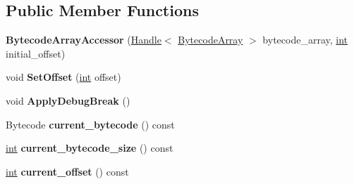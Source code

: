 \subsection*{Public Member Functions}
\begin{DoxyCompactItemize}
\item 
\mbox{\label{classv8_1_1internal_1_1interpreter_1_1BytecodeArrayAccessor_a31476fae6c83ffaafa39e88d589a50cb}} 
{\bfseries Bytecode\+Array\+Accessor} (\mbox{\hyperlink{classv8_1_1internal_1_1Handle}{Handle}}$<$ \mbox{\hyperlink{classv8_1_1internal_1_1BytecodeArray}{Bytecode\+Array}} $>$ bytecode\+\_\+array, \mbox{\hyperlink{classint}{int}} initial\+\_\+offset)
\item 
\mbox{\label{classv8_1_1internal_1_1interpreter_1_1BytecodeArrayAccessor_a3eddb0189545e35104117380f4828c97}} 
void {\bfseries Set\+Offset} (\mbox{\hyperlink{classint}{int}} offset)
\item 
\mbox{\label{classv8_1_1internal_1_1interpreter_1_1BytecodeArrayAccessor_aa9a9072e3ac5266e62da2f6d805c6a9f}} 
void {\bfseries Apply\+Debug\+Break} ()
\item 
\mbox{\label{classv8_1_1internal_1_1interpreter_1_1BytecodeArrayAccessor_a5dc47500889ea2eaaee178590eff92fe}} 
Bytecode {\bfseries current\+\_\+bytecode} () const
\item 
\mbox{\label{classv8_1_1internal_1_1interpreter_1_1BytecodeArrayAccessor_a3ae892a7050123b6649a3dab1adfa77f}} 
\mbox{\hyperlink{classint}{int}} {\bfseries current\+\_\+bytecode\+\_\+size} () const
\item 
\mbox{\label{classv8_1_1internal_1_1interpreter_1_1BytecodeArrayAccessor_a91f0afe0c878c9f49a46b489f04f43f6}} 
\mbox{\hyperlink{classint}{int}} {\bfseries current\+\_\+offset} () const
\item 
\mbox{\label{classv8_1_1internal_1_1interpreter_1_1BytecodeArrayAccessor_a0584b94f48b0147a989bec302b4afc0b}} 

\end{DoxyCompactItemize}
